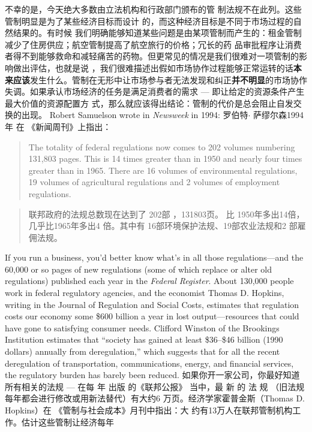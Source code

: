 \begin{paracol}{2}
不幸的是，今天绝大多数由立法机构和行政部门颁布的管
制法规不在此列。这些管制明显是为了某些经济目标而设计
的，而这种经济目标是不同于市场过程的自然结果的。有时候
我们明确能够知道某些问题是由某项管制而产生的：租金管制
减少了住房供应；航空管制提高了航空旅行的价格；冗长的药
品审批程序让消费者得不到能够救命和减轻痛苦的药物。但更常见的情况是我们很难对一项管制的影响做出评估，也就是说 ，我们很难描述出假如市场协作过程能够正常运转的话\textbf{本来应该}发生什么。管制在无形中让市场参与者无法发现和纠正\textbf{并不明显}的市场协作失调。如果承认市场经济的任务是满足消费者的需求 --- 即让给定的资源条件产生最大价值的资源配置方
式，那么就应该得出结论：管制的代价是总会阻止自发交换的出现。
\switchcolumn*
Robert Samuelson wrote in \textit{Newsweek} in 1994:
\switchcolumn
罗伯特$\cdot$ 萨缪尔森1994年 在 《新闻周刊》上指出：
\switchcolumn*
\begin{quote}
The totality of federal regulations now comes to 202 volumes
numbering 131,803 pages. This is 14 times greater than in 1950
and nearly four times greater than in 1965. There are 16 volumes
of environmental regulations, 19 volumes of agricultural regulations and 2 volumes of employment regulations.
\end{quote}
\switchcolumn
\begin{quote}
联邦政府的法规总数现在达到了 202部 ，131803页。
比 1950年多出14倍，几乎比1965年多出4 倍。其中有
16部环境保护法规、19部农业法规和2 部雇佣法规。
\end{quote}
\switchcolumn*
If you run a business, you'd better know what's in all those
regulations---and the 60,000 or so pages of new regulations
(some of which replace or alter old regulations) published each
year in the \textit{Federal Register}. About 130,000 people work in federal regulatory agencies, and the economist Thomas D. Hopkins, writing in the Journal of Regulation and Social Costs,
estimates that regulation costs our economy some \$600 billion a year in lost output---resources that could have gone to satisfying consumer needs. Clifford Winston of the Brookings Institution estimates that ``society has gained at least \$36--\$46
billion (1990 dollars) annually from deregulation,'' which suggests that for all the recent deregulation of transportation,
communications, energy, and financial services, the regulatory
burden has barely been reduced.
\switchcolumn
如果你开一家公司，你最好知道所有相关的法规 --- 在每
年 出版 的《联邦公报》 当中，最 新 的 法 规 （旧法规每年都会进行修改或用新法替代）有大约6 万页。经济学家霍普金斯（Thomas D. Hopkins）在 《管制与社会成本》月刊中指出：大
约有13万人在联邦管制机构工作。估计这些管制让经济每年

\end{paracol}
